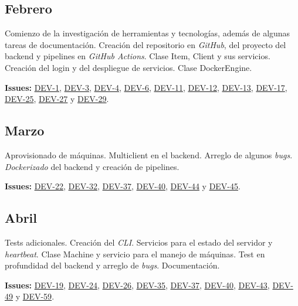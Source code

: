 \subsection{Febrero}
Comienzo de la investigación de herramientas y tecnologías, además de algunas tareas de documentación. Creación del repositorio en \textit{GitHub}, del proyecto del backend y pipelines en \textit{GitHub Actions}. Clase Item, Client y sus servicios. Creación del login y del despliegue de servicios. Clase DockerEngine.

\bigskip
\textbf{Issues:} \href{https://github.com/harvestcore/tfg/issues/1}{DEV-1}, \href{https://github.com/harvestcore/tfg/issues/3}{DEV-3}, \href{https://github.com/harvestcore/tfg/issues/4}{DEV-4}, \href{https://github.com/harvestcore/tfg/issues/6}{DEV-6}, \href{https://github.com/harvestcore/tfg/issues/11}{DEV-11}, \href{https://github.com/harvestcore/tfg/issues/12}{DEV-12}, \href{https://github.com/harvestcore/tfg/issues/13}{DEV-13}, \href{https://github.com/harvestcore/tfg/issues/17}{DEV-17}, \href{https://github.com/harvestcore/tfg/issues/25}{DEV-25}, \href{https://github.com/harvestcore/tfg/issues/27}{DEV-27} y \href{https://github.com/harvestcore/tfg/issues/29}{DEV-29}.


\subsection{Marzo}
Aprovisionado de máquinas. Multiclient en el backend. Arreglo de algunos \textit{bugs}. \textit{Dockerizado} del backend y creación de pipelines.

\bigskip
\textbf{Issues:} \href{https://github.com/harvestcore/tfg/issues/22}{DEV-22},  \href{https://github.com/harvestcore/tfg/issues/32}{DEV-32},  \href{https://github.com/harvestcore/tfg/issues/37}{DEV-37},  \href{https://github.com/harvestcore/tfg/issues/40}{DEV-40},  \href{https://github.com/harvestcore/tfg/issues/44}{DEV-44} y  \href{https://github.com/harvestcore/tfg/issues/45}{DEV-45}. 


\subsection{Abril}
Tests adicionales. Creación del \textit{CLI}. Servicios para el estado del servidor y \textit{heartbeat}. Clase Machine y servicio para el manejo de máquinas. Test en profundidad del backend y arreglo de \textit{bugs}. Documentación.

\bigskip
\textbf{Issues:} \href{https://github.com/harvestcore/tfg/issues/19}{DEV-19},  \href{https://github.com/harvestcore/tfg/issues/24}{DEV-24},  \href{https://github.com/harvestcore/tfg/issues/26}{DEV-26},  \href{https://github.com/harvestcore/tfg/issues/35}{DEV-35},  \href{https://github.com/harvestcore/tfg/issues/37}{DEV-37},  \href{https://github.com/harvestcore/tfg/issues/40}{DEV-40},  \href{https://github.com/harvestcore/tfg/issues/43}{DEV-43},  \href{https://github.com/harvestcore/tfg/issues/49}{DEV-49} y  \href{https://github.com/harvestcore/tfg/issues/59}{DEV-59}.


